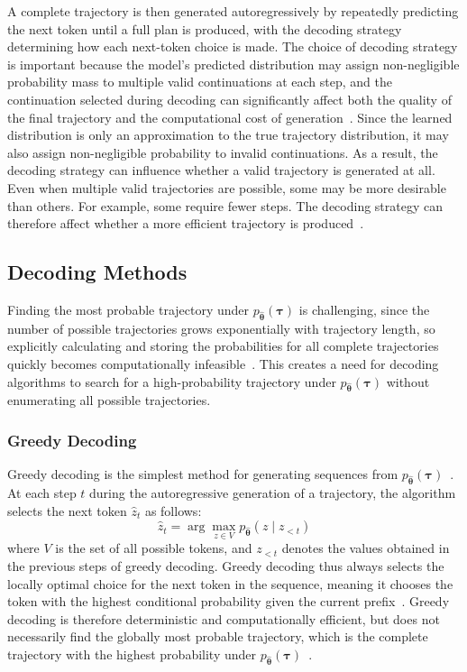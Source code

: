 ﻿\documentclass[12pt,a4paper]{article}
\let\oldcite\cite
\renewcommand{\cite}[1]{\mbox{\oldcite{#1}}}
\theoremstyle{definition}
\begin{document}
A complete trajectory is then generated autoregressively by repeatedly predicting the next token 
until a full plan is produced, with the decoding strategy determining how each next-token choice 
is made. The choice of decoding strategy is important because the model's predicted distribution
 may assign non-negligible probability mass to multiple valid continuations at each step, and the 
 continuation selected during decoding can significantly affect both the quality of the final 
 trajectory and the computational cost of generation~\cite{janner2021trajectory}. Since the learned 
 distribution is only an approximation to the true trajectory distribution, it may also assign 
 non-negligible probability to invalid continuations. As a result, the decoding strategy can 
 influence whether a valid trajectory is generated at all. Even when multiple valid trajectories 
 are possible, some may be more desirable than others. For example, some require fewer steps. 
 The decoding strategy can therefore affect whether a more 
 efficient trajectory is produced~\cite{janner2021trajectory,jurafsky2026speech}.

\subsection{Decoding Methods}
Finding the most probable trajectory under $p_{\hat{\boldsymbol{\theta}}}(\boldsymbol{\tau})$ is challenging, since the number of possible trajectories grows exponentially with trajectory
length, so explicitly calculating and storing the probabilities for all complete trajectories quickly  becomes computationally 
infeasible~\cite{goodfellow2016deep}. 
This creates a need for decoding algorithms to search for a high-probability trajectory under $p_{\hat{\boldsymbol{\theta}}}(\boldsymbol{\tau})$ without enumerating all possible trajectories.



\subsubsection{Greedy Decoding}
Greedy decoding is the simplest method for generating sequences from $p_{\hat{\boldsymbol{\theta}}}(\boldsymbol{\tau})$~\cite{jurafsky2026speech}. 
At each step $t$ during the autoregressive generation of a trajectory, the algorithm selects the next token $\hat{z}_t$ 
as follows:
\begin{equation}
\hat{z}_t = \arg\max_{z \in V} p_{\hat{\boldsymbol{\theta}}}(z \mid z_{<t})
\end{equation}
where $V$ is the set of all possible tokens, and $z_{<t}$ denotes the values obtained in the previous steps of greedy decoding.
Greedy decoding thus always selects the locally optimal choice for the next token in the sequence, 
meaning it chooses the token with the highest conditional probability given
the current prefix~\cite{jurafsky2026speech}.
Greedy decoding is therefore deterministic and computationally efficient, but does not necessarily find the globally most probable 
trajectory, which is the complete trajectory with the highest probability under 
$p_{\hat{\boldsymbol{\theta}}}(\boldsymbol{\tau})$~\cite{jurafsky2026speech}.
\end{document}
